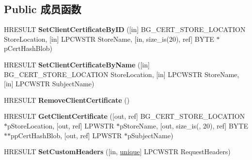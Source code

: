 \subsection*{Public 成员函数}
\begin{DoxyCompactItemize}
\item 
\mbox{\label{interface_i_background_copy_job_http_options_aa922b516c5da632b02fe1dffb0a4f325}} 
H\+R\+E\+S\+U\+LT {\bfseries Set\+Client\+Certificate\+By\+ID} (\mbox{[}in\mbox{]} B\+G\+\_\+\+C\+E\+R\+T\+\_\+\+S\+T\+O\+R\+E\+\_\+\+L\+O\+C\+A\+T\+I\+ON Store\+Location, \mbox{[}in\mbox{]} L\+P\+C\+W\+S\+TR Store\+Name, \mbox{[}in, size\+\_\+is(20), ref\mbox{]} B\+Y\+TE $\ast$p\+Cert\+Hash\+Blob)
\item 
\mbox{\label{interface_i_background_copy_job_http_options_a1777422cee24d736db5b465d28ba59bf}} 
H\+R\+E\+S\+U\+LT {\bfseries Set\+Client\+Certificate\+By\+Name} (\mbox{[}in\mbox{]} B\+G\+\_\+\+C\+E\+R\+T\+\_\+\+S\+T\+O\+R\+E\+\_\+\+L\+O\+C\+A\+T\+I\+ON Store\+Location, \mbox{[}in\mbox{]} L\+P\+C\+W\+S\+TR Store\+Name, \mbox{[}in\mbox{]} L\+P\+C\+W\+S\+TR Subject\+Name)
\item 
\mbox{\label{interface_i_background_copy_job_http_options_af1b6802ec5eb8952dc9a1a84f6ca735f}} 
H\+R\+E\+S\+U\+LT {\bfseries Remove\+Client\+Certificate} ()
\item 
\mbox{\label{interface_i_background_copy_job_http_options_a456ec592a3b873b0622220edb4881f96}} 
H\+R\+E\+S\+U\+LT {\bfseries Get\+Client\+Certificate} (\mbox{[}out, ref\mbox{]} B\+G\+\_\+\+C\+E\+R\+T\+\_\+\+S\+T\+O\+R\+E\+\_\+\+L\+O\+C\+A\+T\+I\+ON $\ast$p\+Store\+Location, \mbox{[}out, ref\mbox{]} L\+P\+W\+S\+TR $\ast$p\+Store\+Name, \mbox{[}out, size\+\_\+is(, 20), ref\mbox{]} B\+Y\+TE $\ast$$\ast$pp\+Cert\+Hash\+Blob, \mbox{[}out, ref\mbox{]} L\+P\+W\+S\+TR $\ast$p\+Subject\+Name)
\item 
\mbox{\label{interface_i_background_copy_job_http_options_a7d4a2be470c8a509a2fda80123af2d0c}} 
H\+R\+E\+S\+U\+LT {\bfseries Set\+Custom\+Headers} (\mbox{[}in, \hyperlink{interfaceunique}{unique}\mbox{]} L\+P\+C\+W\+S\+TR Request\+Headers)
$$
\end{DoxyCompactItemize}
